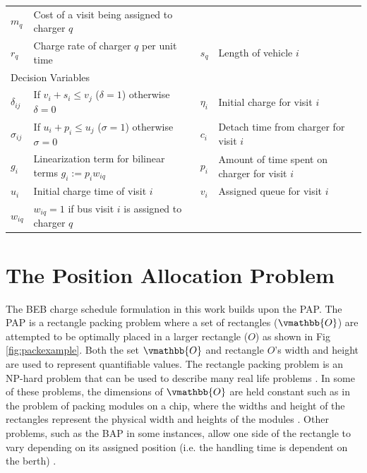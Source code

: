 \documentclass[letterpaper, 10pt, conference]{IEEEtran}
\begin{document}
\begin{table}[!t]
\begin{tabular}{l l l l}
			$m_q$        & Cost of a visit being assigned to charger $q$                      \\
			$r_q$        & Charge rate of charger $q$ per unit time                           &
			$s_q$        & Length of vehicle $i$                                              \\
		\hline
		\multicolumn{4}{l}{Decision Variables} \\
			$\delta_{ij}$ & If $v_i + s_i \leq v_j$ ($\delta = 1$) otherwise $\delta = 0$ &
			$\eta_i$      & Initial charge for visit $i$                                 \\
			$\sigma_{ij}$ & If $u_i + p_i \leq u_j$ ($\sigma = 1$) otherwise $\sigma = 0$ &
			$c_i$         & Detach time from charger for visit $i$                       \\
			$g_i$         & Linearization term for bilinear terms $g_i := p_i w_{iq}$     &
			$p_i$         & Amount of time spent on charger for visit $i$                \\
			$u_i$         & Initial charge time of visit $i$                             &
			$v_i$         & Assigned queue for visit $i$                                 \\
     			$w_{iq}$      & $w_{iq} = 1$ if bus visit $i$ is assigned to charger $q$       \\
			\bottomrule
	\end{tabular}
\end{table}

\section{The Position Allocation Problem}
\label{sec:positionallocationproblem}
The BEB charge schedule formulation in this work builds upon the PAP. The PAP is a rectangle packing problem where a set of rectangles ($\vmathbb{O}$) are attempted to be optimally placed in a larger rectangle ($O$) as shown in Fig \ref{fig:packexample}. Both the set $\vmathbb{O}$ and rectangle $O$'s width and height are used to represent quantifiable values. The rectangle packing problem is an NP-hard problem that can be used to describe many real life problems \cite{Bruin2013,Murata1995}. In some of these problems, the dimensions of $\vmathbb{O}$ are held constant such as in the problem of packing modules on a chip, where the widths and height of the rectangles represent the physical width and heights of the modules \cite{Murata1995}. Other problems, such as the BAP in some instances, allow one side of the rectangle to vary depending on its assigned position (i.e. the handling time is dependent on the berth) \cite{Buhrkal2010}.
\end{document}
